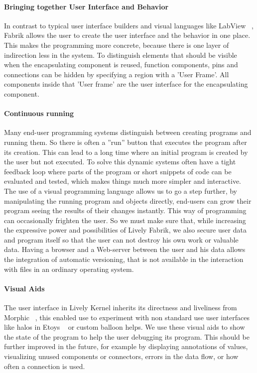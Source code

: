 \documentclass[pdftex, times, 10pt, twocolumn]{article}
\begin{document}
\paragraph{Bringing together User Interface and Behavior}
In contrast to typical user interface builders and visual languages like LabView ~\cite{Bitter2006LAP}, Fabrik allows the user to create the user interface and the behavior in one place. This makes the programming more concrete, because there is one layer of indirection less in the system. To distinguish elements that should be visible when the encapsulating component is reused, function components, pins and connections can be hidden by specifying a region with a 'User Frame'. All components inside that 'User frame' are the user interface for the encapsulating component.  



\paragraph{Continuous running}
Many end-user programming systems distinguish between creating programs and running them. So there is often a ''run'' button that executes the program after its creation. This can lead to a long time where an initial program is created by the user but not executed. To solve this dynamic systems often have a tight feedback loop where parts of the program or short snippets of code can be evaluated and tested, which makes things much more simpler and interactive.  The use of a visual programming language allows us to go a step further, by manipulating the running program and objects directly, end-users can grow their program seeing the results of their changes instantly. This way of programming can occasionally frighten the user. So we must make sure that, while increasing the expressive power and possibilities of Lively Fabrik, we also secure user data and program itself so that the user can not destroy his own work or valuable data. Having a browser and a Web-server between the user and his data allows the integration of automatic versioning, that is not available in the interaction with files in an ordinary operating system.  



\paragraph{Visual Aids}
The user interface in Lively Kernel inherits its directness and liveliness from Morphic ~\cite{Maloney1995DLM}, this enabled use to experiment with non standard use user interfaces like halos in Etoys  ~\cite{Kay2005SEA} or custom balloon helps. We use these  visual aids to show the state of the program to help the user debugging its program. This should be further improved in the future, for example by displaying annotations of values, visualizing unused components or connectors, errors in the data flow, or how often a connection is used. 
\end{document}
